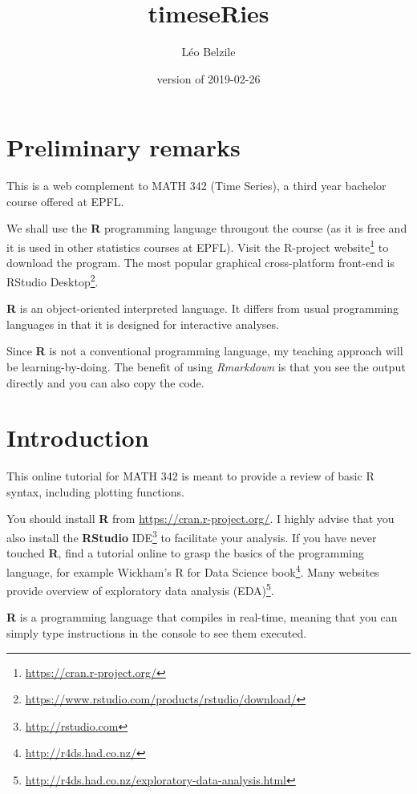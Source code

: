 \documentclass[]{book}
\title{timeseRies}
\author{Léo Belzile}
\date{version of 2019-02-26}
\let\rmarkdownfootnote\footnote%
\def\footnote{\protect\rmarkdownfootnote}
\renewcommand{\href}[2]{#2\footnote{\url{#1}}}
\begin{document}
\maketitle

{
\setcounter{tocdepth}{1}
\tableofcontents
}
\hypertarget{preliminary-remarks}{%
\chapter*{Preliminary remarks}\label{preliminary-remarks}}

This is a web complement to MATH 342 (Time Series), a third year bachelor course offered at EPFL.

We shall use the \textbf{R} programming language througout the course (as it is free and it is used in other statistics courses at EPFL). Visit \href{https://cran.r-project.org/}{the R-project website} to download the program. The most popular graphical cross-platform front-end is \href{https://www.rstudio.com/products/rstudio/download/}{RStudio Desktop}.

\textbf{R} is an object-oriented interpreted language. It differs from usual programming languages in that it is designed for interactive analyses.

Since \textbf{R} is not a conventional programming language, my teaching approach will be learning-by-doing. The benefit of using \emph{Rmarkdown} is that you see the output directly and you can also copy the code.

\hypertarget{introduction}{%
\chapter{Introduction}\label{introduction}}

This online tutorial for MATH 342 is meant to provide a review of basic R syntax, including plotting functions.

You should install \textbf{R} from \url{https://cran.r-project.org/}. I highly advise that you also install the \href{http://rstudio.com}{\textbf{RStudio} IDE} to facilitate your analysis. If you have never touched \textbf{R}, find a tutorial online to grasp the basics of the programming language, for example \href{http://r4ds.had.co.nz/}{Wickham's R for Data Science book}. Many websites provide overview of \href{http://r4ds.had.co.nz/exploratory-data-analysis.html}{exploratory data analysis (EDA)}.

\textbf{R} is a programming language that compiles in real-time, meaning that you can simply type instructions in the console to see them executed.
\end{document}
